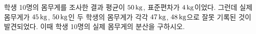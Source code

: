 학생 10명의 몸무게를 조사한 결과 평균이 $50\mkern3mu \mathrm{kg}$, 표준편차가 $4\mkern3mu \mathrm{kg}$이었다. 그런데 실제 몸무게가 $45\mkern3mu \mathrm{kg}$, $50\mkern3mu \mathrm{kg}$인 두 학생의 몸무게가 각각 $47\mkern3mu \mathrm{kg}$, $48\mkern3mu \mathrm{kg}$으로 잘못 기록된 것이 발견되었다. 이때 학생 10명의 실제 몸무게의 분산을 구하시오.
